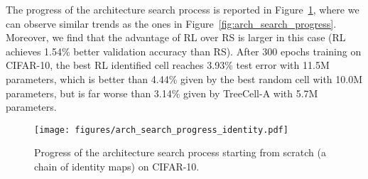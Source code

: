 \documentclass{article}
\begin{document}
The progress of the architecture search process is reported in Figure~\ref{fig:arch_search_progress_identity}, where we can observe similar trends as the ones in Figure~\ref{fig:arch_search_progress}. Moreover, we find that the advantage of RL over RS is larger in this case (RL achieves 1.54\% better validation accuracy than RS). After 300 epochs training on CIFAR-10, the best RL identified cell reaches 3.93\% test error with 11.5M parameters, which is better than 4.44\% given by the best random cell with 10.0M parameters, but is far worse than 3.14\% given by TreeCell-A with 5.7M parameters.  

\begin{table}[h]
	\centering
	\caption{Start point network with identity mappings on CIFAR-10.}\label{tab:identity_start_point}
	\vspace{5pt}
\end{table}

\begin{figure}[h]
	\centering
	\texttt{[image: figures/arch\_search\_progress\_identity.pdf]}
	\caption{Progress of the architecture search process starting from scratch (a chain of identity maps) on CIFAR-10.}
	\label{fig:arch_search_progress_identity}
\end{figure}
\end{document}
